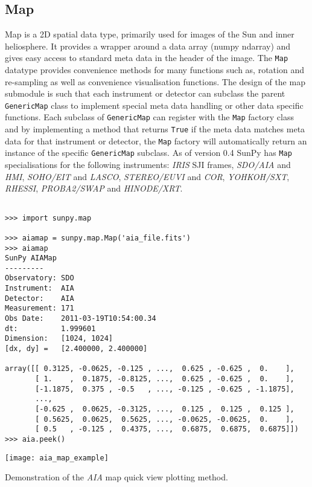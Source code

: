 \subsection{Map}
Map is a 2D spatial data type, primarily used for images of the Sun and 
inner heliosphere. It provides a wrapper around a data array (numpy 
ndarray) and gives easy access to standard meta data in the header of the 
image.
The \texttt{Map} datatype provides convenience methods for many functions 
such as, rotation and re-sampling as well as convenience visualisation 
functions.
The design of the map submodule is such that each instrument or 
detector can subclass the parent \texttt{GenericMap} class to implement 
special meta data handling or other data specific functions. Each subclass 
of \texttt{GenericMap} can register with the \texttt{Map} factory class and 
by implementing a method that returns \texttt{True} if the meta data 
matches meta data for that instrument or detector, the \texttt{Map} factory 
will automatically return an instance of the specific \texttt{GenericMap} 
subclass. As of version 0.4 SunPy has \texttt{Map} specialisations for the 
following instruments: \textit{IRIS} SJI frames, \textit{SDO/AIA} and 
\textit{HMI}, \textit{SOHO/EIT} and	\textit{LASCO}, \textit{STEREO/EUVI} and 
\textit{COR}, \textit{YOHKOH/SXT}, \textit{RHESSI}, \textit{PROBA2/SWAP} and 
\textit{HINODE/XRT}.

\begin{listing}[h]
\begin{verbatim}

>>> import sunpy.map

>>> aiamap = sunpy.map.Map('aia_file.fits')
>>> aiamap
SunPy AIAMap
---------
Observatory: SDO
Instrument:  AIA
Detector:    AIA
Measurement: 171
Obs Date:    2011-03-19T10:54:00.34
dt:          1.999601
Dimension:   [1024, 1024]
[dx, dy] =   [2.400000, 2.400000]

array([[ 0.3125, -0.0625, -0.125 , ...,  0.625 , -0.625 ,  0.    ],
       [ 1.    ,  0.1875, -0.8125, ...,  0.625 , -0.625 ,  0.    ],
       [-1.1875,  0.375 , -0.5   , ..., -0.125 , -0.625 , -1.1875],
       ..., 
       [-0.625 ,  0.0625, -0.3125, ...,  0.125 ,  0.125 ,  0.125 ],
       [ 0.5625,  0.0625,  0.5625, ..., -0.0625, -0.0625,  0.    ],
       [ 0.5   , -0.125 ,  0.4375, ...,  0.6875,  0.6875,  0.6875]])
>>> aia.peek()
\end{verbatim}
\texttt{[image: aia\_map\_example]}
\caption{Demonstration of the \textit{AIA} map quick view plotting method.}
\label{code:aia_1}
\end{listing}

